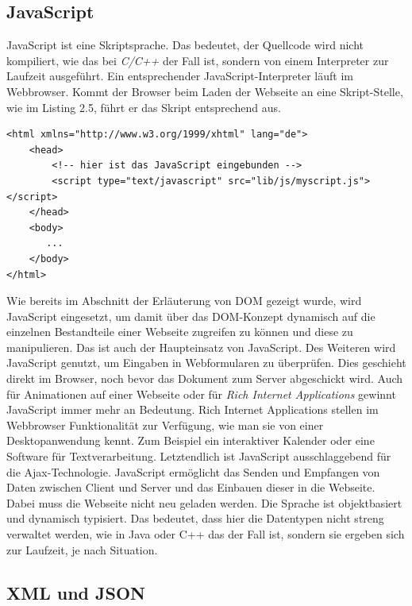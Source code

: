 \subsection{JavaScript}
JavaScript\cite{JavaScript:01} ist eine Skriptsprache. 
Das bedeutet, der Quellcode wird nicht kompiliert, wie das bei \emph{C/C++} der Fall ist,
sondern von einem Interpreter zur Laufzeit ausgef\"uhrt.
Ein entsprechender JavaScript-Interpreter l\"auft im Webbrowser.
Kommt der Browser beim Laden der Webseite an eine Skript-Stelle,
wie im Listing 2.5, f\"uhrt er das Skript entsprechend aus.\\

\begin{lstlisting}[caption={Eine JavaScript Datei eingebunden in ein HTML-Dokument}]
<html xmlns="http://www.w3.org/1999/xhtml" lang="de">
    <head>    
        <!-- hier ist das JavaScript eingebunden -->
        <script type="text/javascript" src="lib/js/myscript.js"></script>
    </head>        
    <body>        
       ...
    </body>
</html>

\end{lstlisting}

Wie bereits im Abschnitt der Erl\"auterung von DOM gezeigt wurde, wird JavaScript eingesetzt, um damit \"uber das DOM-Konzept
dynamisch auf die einzelnen Bestandteile einer Webseite zugreifen zu k\"onnen und diese zu manipulieren.
Das ist auch der Haupteinsatz von JavaScript. 
Des Weiteren wird JavaScript genutzt, um Eingaben in Webformularen zu \"uberpr\"ufen.
Dies geschieht direkt im Browser, noch bevor das Dokument zum Server abgeschickt wird.
Auch f\"ur Animationen auf einer Webseite oder f\"ur \emph{Rich Internet Applications} gewinnt JavaScript immer mehr an Bedeutung.
Rich Internet Applications stellen im Webbrowser Funktionalit\"at zur Verf\"ugung, wie man sie von einer Desktopanwendung kennt.
Zum Beispiel ein interaktiver Kalender oder eine Software f\"ur Textverarbeitung.
Letztendlich ist JavaScript ausschlaggebend f\"ur die Ajax-Technologie.
JavaScript erm\"oglicht das Senden und Empfangen von Daten zwischen Client und Server und
das Einbauen dieser in die Webseite. 
Dabei muss die Webseite nicht neu geladen werden.
Die Sprache ist objektbasiert und dynamisch typisiert. 
Das bedeutet, dass hier die Datentypen nicht streng verwaltet werden, wie in Java oder C++ das der Fall ist,
sondern sie ergeben sich zur Laufzeit, je nach Situation. \\


\subsection{XML und JSON}

